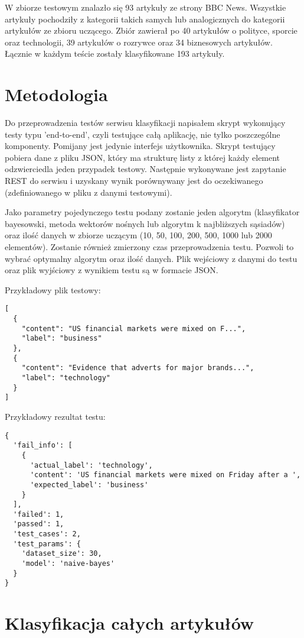 W zbiorze testowym znalazło się 93 artykuły ze strony BBC News. Wszystkie artykuły pochodziły z kategorii takich samych lub analogicznych do kategorii artykułów ze zbioru uczącego. Zbiór zawierał po 40 artykułów o polityce, sporcie oraz technologii, 39 artykułów o rozrywce oraz 34 biznesowych artykułów. Łącznie w każdym teście zostały klasyfikowane 193 artykuły.

\section{Metodologia}

Do przeprowadzenia testów serwisu klasyfikacji napisałem skrypt wykonujący testy typu 'end-to-end', czyli testujące całą aplikację, nie tylko poszczególne komponenty. Pomijany jest jedynie interfejs użytkownika. Skrypt testujący pobiera dane z pliku JSON, który ma strukturę listy z której każdy element odzwierciedla jeden przypadek testowy. Następnie wykonywane jest zapytanie REST do serwisu i uzyskany wynik porównywany jest do oczekiwanego (zdefiniowanego w pliku z danymi testowymi).

Jako parametry pojedynczego testu podany zostanie jeden algorytm (klasyfikator bayesowski, metoda wektorów nośnych lub algorytm k najbliższych sąsiadów) oraz ilość danych w zbiorze uczącym (10, 50, 100, 200, 500, 1000 lub 2000 elementów). Zostanie również zmierzony czas przeprowadzenia testu. Pozwoli to wybrać optymalny algorytm oraz ilość danych. Plik wejściowy z danymi do testu oraz plik wyjściowy z wynikiem testu są w formacie JSON.

Przykładowy plik testowy:

\begin{verbatim}
[
  {
    "content": "US financial markets were mixed on F...",
    "label": "business"
  },
  {
    "content": "Evidence that adverts for major brands...",
    "label": "technology"
  }
]
\end{verbatim}

Przykładowy rezultat testu:

\begin{verbatim}
{
  'fail_info': [
    {
      'actual_label': 'technology',
      'content': 'US financial markets were mixed on Friday after a ',
      'expected_label': 'business'
    }
  ],
  'failed': 1,
  'passed': 1,
  'test_cases': 2,
  'test_params': {
    'dataset_size': 30,
    'model': 'naive-bayes'
  }
}
\end{verbatim}

\section{Klasyfikacja całych artykułów}

